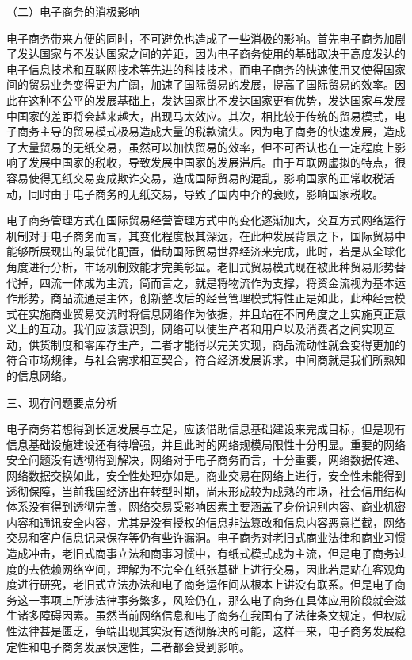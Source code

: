 （二）电子商务的消极影响

电子商务带来方便的同时，不可避免也造成了一些消极的影响。首先电子商务加剧了发达国家与不发达国家之间的差距，因为电子商务使用的基础取决于高度发达的电子信息技术和互联网技术等先进的科技技术，而电子商务的快速使用又使得国家间的贸易业务变得更为广阔，加速了国际贸易的发展，提高了国际贸易的效率。因此在这种不公平的发展基础上，发达国家比不发达国家更有优势，发达国家与发展中国家的差距将会越来越大，出现马太效应。其次，相比较于传统的贸易模式，电子商务主导的贸易模式极易造成大量的税款流失。因为电子商务的快速发展，造成了大量贸易的无纸交易，虽然可以加快贸易的效率，但不可否认也在一定程度上影响了发展中国家的税收，导致发展中国家的发展滞后。由于互联网虚拟的特点，很容易使得无纸交易变成欺诈交易，造成国际贸易的混乱，影响国家的正常收税活动，同时由于电子商务的无纸交易，导致了国内中介的衰败，影响国家税收。 




电子商务管理方式在国际贸易经营管理方式中的变化逐渐加大，交互方式网络运行机制对于电子商务而言，其变化程度极其深远，在此种发展背景之下，国际贸易中能够所展现出的最优化配置，借助国际贸易世界经济来完成，此时，若是从全球化角度进行分析，市场机制效能才完美彰显。老旧式贸易模式现在被此种贸易形势替代掉，四流一体成为主流，简而言之，就是将物流作为支撑，将资金流视为基本运作形势，商品流通是主体，创新整改后的经营管理模式特性正是如此，此种经营模式在实施商业贸易交流时将信息网络作为依据，并且站在不同角度之上实施真正意义上的互动。我们应该意识到，网络可以使生产者和用户以及消费者之间实现互动，供货制度和零库存生产，二者才能得以完美实现，商品流动性就会变得更加的符合市场规律，与社会需求相互契合，符合经济发展诉求，中间商就是我们所熟知的信息网络。

三、现存问题要点分析

电子商务若想得到长远发展与立足，应该借助信息基础建设来完成目标，但是现有信息基础设施建设还有待增强，并且此时的网络规模局限性十分明显。重要的网络安全问题没有透彻得到解决，网络对于电子商务而言，十分重要，网络数据传递、网络数据交换如此，安全性处理亦如是。商业交易在网络上进行，安全性未能得到透彻保障，当前我国经济出在转型时期，尚未形成较为成熟的市场，社会信用结构体系没有得到透彻完善，网络交易受影响因素主要涵盖了身份识别内容、商业机密内容和通讯安全内容，尤其是没有授权的信息非法篡改和信息内容恶意拦截，网络交易和客户信息记录保存等仍有些许漏洞。电子商务对老旧式商业法律和商业习惯造成冲击，老旧式商事立法和商事习惯中，有纸式模式成为主流，但是电子商务过度的去依赖网络空间，理解为不完全在纸张基础上进行交易，因此若是站在客观角度进行研究，老旧式立法办法和电子商务运作间从根本上讲没有联系。但是电子商务这一事项上所涉法律事务繁多，风险仍在，那么电子商务在具体应用阶段就会滋生诸多障碍因素。虽然当前网络信息和电子商务在我国有了法律条文规定，但权威性法律甚是匮乏，争端出现其实没有透彻解决的可能，这样一来，电子商务发展稳定性和电子商务发展快速性，二者都会受到影响。


